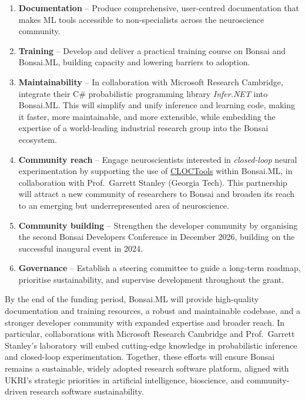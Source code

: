 \begin{enumerate}

  \item \textbf{Documentation} – Produce comprehensive, user-centred
documentation that makes ML tools accessible to non-specialists across the
neuroscience community.  

  \item \textbf{Training} – Develop and deliver a practical training course on
Bonsai and Bonsai.ML, building capacity and lowering barriers to adoption.  

  \item \textbf{Maintainability} – In collaboration with Microsoft Research
  Cambridge, integrate their C\# probabilistic programming library
  \emph{Infer.NET} into Bonsai.ML. This will simplify and unify inference and
  learning code, making it faster, more maintainable, and more extensible,
  while embedding the expertise of a world-leading industrial research group
  into the Bonsai ecosystem.

  \item \textbf{Community reach} – Engage neuroscientists interested in
\emph{closed-loop} neural experimentation by supporting the use of
\href{https://cloctools.github.io/}{CLOCTools} within Bonsai.ML, in
collaboration with Prof.~Garrett Stanley (Georgia Tech). This partnership will
attract a new community of researchers to Bonsai and broaden its reach to an
emerging but underrepresented area of neuroscience.

  \item \textbf{Community building} – Strengthen the developer community by
organising the second Bonsai Developers Conference in December 2026, building
on the successful inaugural event in 2024.  

  \item \textbf{Governance} – Establish a steering committee to guide a
long-term roadmap, prioritise sustainability, and supervise development
throughout the grant.

\end{enumerate}

By the end of the funding period, Bonsai.ML will provide high-quality
documentation and training resources, a robust and maintainable codebase, and a
stronger developer community with expanded expertise and broader reach. In
particular, collaborations with Microsoft Research Cambridge and
Prof.~Garrett Stanley’s laboratory will embed cutting-edge knowledge in
probabilistic inference and closed-loop experimentation. Together, these
efforts will ensure Bonsai remains a sustainable, widely adopted research
software platform, aligned with UKRI’s strategic priorities in artificial
intelligence, bioscience, and community-driven research software
sustainability.

